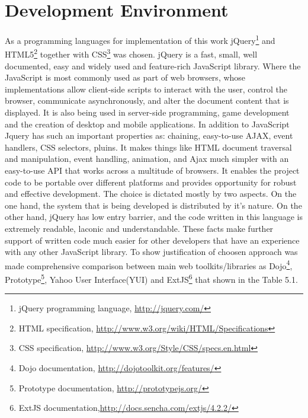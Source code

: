 \section{Development Environment}
	As a programming languages for implementation of this work jQuery\footnote{jQuery programming language, \url{http://jquery.com/}} and HTML5\footnote{HTML specification, \url{http://www.w3.org/wiki/HTML/Specifications}} together with CSS\footnote{CSS specification, \url{http://www.w3.org/Style/CSS/specs.en.html}} was chosen. jQuery is a fast, small, well documented, easy and widely used and feature-rich JavaScript library. Where the JavaScript is most commonly used as part of web browsers, whose implementations allow client-side scripts to interact with the user, control the browser, communicate asynchronously, and alter the document content that is displayed. It is also being used in server-side programming, game development and the creation of desktop and mobile applications. In addition to JavaScript Jquery has such an important properties as: chaining, easy-to-use AJAX, event handlers, CSS selectors, pluins. It makes things like HTML document traversal and manipulation, event handling, animation, and Ajax much simpler with an easy-to-use API that works across a multitude of browsers. It enables the project code to be portable over different platforms and provides opportunity for robust and effective development. The choice is dictated mostly by two aspects. On the one hand, the system that is being developed is distributed by it's nature. On the other hand, jQuery has low entry barrier, and the code written in this language is extremely readable, laconic and understandable. These facts make further support of written code much easier for other developers that have an experience with any other JavaScript library. 
	\newline
	To show justification of choosen approach was made comprehensive comparison between main web toolkits/libraries as Dojo\footnote{Dojo documentation, \url{http://dojotoolkit.org/features/}}, Prototype\footnote{Prototype documentation, \url{http://prototypejs.org/}}, Yahoo User Interface(YUI) and ExtJS\footnote{ExtJS documentation,\url{http://docs.sencha.com/extjs/4.2.2/}} that shown in the Table 5.1. 
